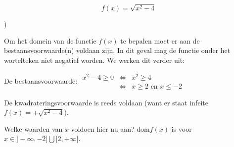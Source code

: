 \begin{voorbeeld}
	\begin{equation*}
f(x)=\sqrt{x^{2}-4}
\end{equation*}

\begin{figure}[h]
		
\end{figure})



Om het domein van de functie $f(x)$ te bepalen moet er aan de bestaansvoorwaarde(n)
voldaan zijn. In dit geval mag de functie onder het wortelteken niet
negatief worden. We werken dit verder uit:

De bestaansvoorwaarde: $\begin{array}{cccl}
x^{2}-4\geq0 &\iff & x^{2}\geq4\\
& \iff & x\geq2 \textrm{ en } x\leq-2
\end{array}$

De kwadrateringsvoorwaarde is reeds voldaan (want er staat infeite
$f(x)=+\sqrt{x^{2}-4}$).

Welke waarden van $x$ voldoen hier nu aan? $\textrm{dom}f(x)$ is voor $x\in]-\infty,-2]\bigcup[2,+\infty[$.

\end{voorbeeld}

